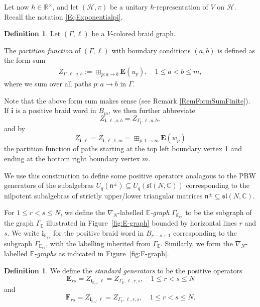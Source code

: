 \documentclass[11pt, reqno]{amsart}
\theoremstyle{definition}
\newtheorem{defn}[theorem]{Definition}
\numberwithin{equation}{section}
\def\C{\mathbb C}
\def\Hc{\mathcal H}
\def\R{\mathbb R}
\newcommand{\Hsp}{\mathcal{H}}
\newcommand{\Eb}{\mathbf{E}}
\newcommand{\mfsl}{\mathfrak{sl}}
\newcommand{\mfn}{\mathfrak{n}}
\def\stgE{\mathbf{E}}
\def\stgF{\mathbf{F}}
\newcommand{\mbi}{\mathbf{i}}
\begin{document}
Let now $\hbar\in \R^{\times}$, and let $(\Hc,\pi)$ be a unitary $\hbar$-representation of $V$ on $\Hsp$. Recall the notation \eqref{EqExponentialpi}.  

\begin{defn}
Let $(\Gamma,\ell)$ be a $V$-colored braid graph. 


The \emph{partition function} of $(\Gamma,\ell)$ with boundary conditions $(a,b)$ is defined as the form sum
\begin{align}
\label{eq:Zdef}
Z_{\Gamma,\ell,a,b} := \boxplus_{p:a\rightarrow b} \Eb(u_p), \quad 1\leq a<b\leq m,
\end{align}
where we sum over all paths $p \colon a\rightarrow b$ in $\Gamma$.
\end{defn}

Note that the above form sum makes sense (see Remark \ref{RemFormSumFinite}). If $\mbi$ is a positive braid word in $B_m$, we then further abbreviate 
\begin{equation}\label{EqPartitionAbb}
Z_{\mbi,\ell,a,b}  = Z_{\Gamma_{\mbi},\ell,a,b},
\end{equation}
and by 
\begin{equation}\label{EqPartitionTopBot}
Z_{\mathbf{i},\ell} = Z_{\mathbf{i},\ell,1,m}=\boxplus_{p:1\rightarrow m} \Eb(w_p)
\end{equation}
the partition function of paths starting at the top left boundary vertex 1 and ending at the bottom right boundary vertex $m$.

We use this construction to define some positive operators  analagous to the PBW generators of the subalgebras $U_q(\mfn^{\pm})\subseteq U_q(\mfsl(N,\C))$ corresponding to the nilpotent subalgebras of strictly upper/lower triangular matrices $\mfn^{\pm} \subseteq \mfsl(N,\C)$. 

For $1\leq r<s\leq N$, we define the $\nabla_N$-labelled  \emph{$\mathbb{E}$-graph} $\Gamma_{\mathbb{E}_{rs}}$ to be the subgraph of the graph $\Gamma_{\mathbb{E}}$ illustrated in Figure~\ref{fig:E-graph} bounded by horizontal lines $r$ and $s$. We write $\mathbf{i}_{\mathbb{E}_{rs}}$ for the positive braid word in $B_{r-s+1}$ corresponding to the subgraph $\Gamma_{\mathbb{E}_{rs}}$, with the labelling inherited from $\Gamma_{\mathbb{E}}$. Similarly, we form  the $\nabla_N$-labelled  \emph{$\mathbb{F}$-graphs} as indicated in Figure~\ref{fig:F-graph}.



 
\begin{defn}
\label{Defstandardgen}
 We define the \emph{standard generators} to be the positive operators
\begin{equation}\label{EqStandardGenE}
\stgE_{rs} = Z_{\mathbf{i}_{\mathbb{E}_{rs}},\ell} = Z_{\Gamma_{\mathbb{E}},\ell,r,s}, \quad 1\leq r<s\leq N
\end{equation}
and
\begin{equation}\label{EqStandardGenF}
\stgF_{rs} = Z_{\mathbf{i}_{\mathbb{F}_{rs}},\ell}=Z_{\Gamma_{\mathbb{F}},\ell,r,s}, \quad 1\leq r<s\leq N.
\end{equation}
\end{defn}
\end{document}
